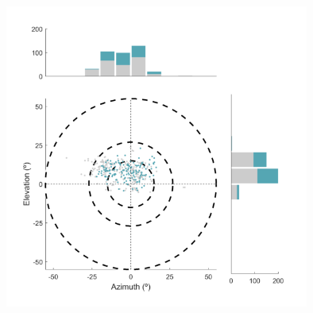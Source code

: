 \begin{figure}[H] \centering \includegraphics[width=10cm,height=10cm,keepaspectratio]{Figures/7.Results/finalPopulation/sel/popPlots_RFpos_Animal4_Session5.png} 
\end{figure}

%
%

